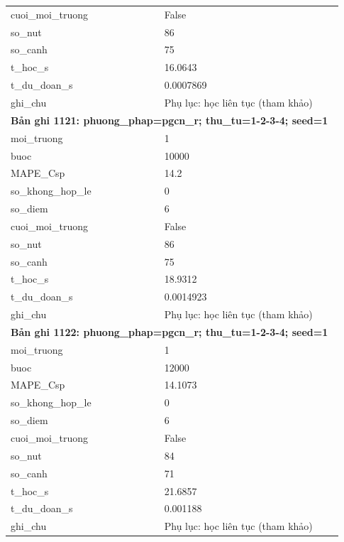 \begin{longtable}{p{0.43\linewidth}p{0.50\linewidth}}
cuoi\_\allowbreak moi\_\allowbreak truong & False \\
so\_\allowbreak nut & 86 \\
so\_\allowbreak canh & 75 \\
t\_\allowbreak hoc\_\allowbreak s & 16.0643 \\
t\_\allowbreak du\_\allowbreak doan\_\allowbreak s & 0.0007869 \\
ghi\_\allowbreak chu & Phụ lục: học liên tục (tham khảo) \\
\midrule
\multicolumn{2}{p{0.95\linewidth}}{\textbf{Bản ghi 1121: phuong\_phap=pgcn\_r; thu\_tu=1-2-3-4; seed=1}} \\
moi\_\allowbreak truong & 1 \\
buoc & 10000 \\
MAPE\_\allowbreak Csp & 14.2 \\
so\_\allowbreak khong\_\allowbreak hop\_\allowbreak le & 0 \\
so\_\allowbreak diem & 6 \\
cuoi\_\allowbreak moi\_\allowbreak truong & False \\
so\_\allowbreak nut & 86 \\
so\_\allowbreak canh & 75 \\
t\_\allowbreak hoc\_\allowbreak s & 18.9312 \\
t\_\allowbreak du\_\allowbreak doan\_\allowbreak s & 0.0014923 \\
ghi\_\allowbreak chu & Phụ lục: học liên tục (tham khảo) \\
\midrule
\multicolumn{2}{p{0.95\linewidth}}{\textbf{Bản ghi 1122: phuong\_phap=pgcn\_r; thu\_tu=1-2-3-4; seed=1}} \\
moi\_\allowbreak truong & 1 \\
buoc & 12000 \\
MAPE\_\allowbreak Csp & 14.1073 \\
so\_\allowbreak khong\_\allowbreak hop\_\allowbreak le & 0 \\
so\_\allowbreak diem & 6 \\
cuoi\_\allowbreak moi\_\allowbreak truong & False \\
so\_\allowbreak nut & 84 \\
so\_\allowbreak canh & 71 \\
t\_\allowbreak hoc\_\allowbreak s & 21.6857 \\
t\_\allowbreak du\_\allowbreak doan\_\allowbreak s & 0.001188 \\
ghi\_\allowbreak chu & Phụ lục: học liên tục (tham khảo) \\

\end{longtable}
